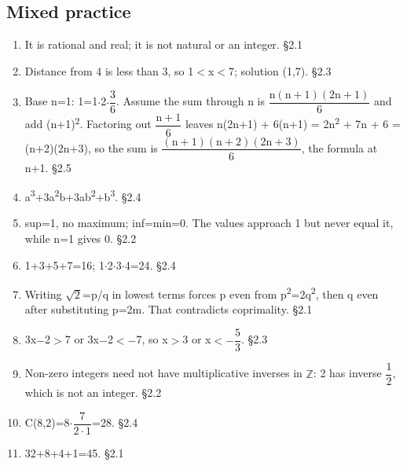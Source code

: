 \documentclass[11pt]{article}
\begin{document}
\begin{keepsection}\subsection{Mixed practice}

\begin{enumerate}
\item It is rational and real; it is not natural or an integer. \hfill{\small\color{FAUblue}§2.1}
\item Distance from 4 is less than 3, so 1\ensuremath{<}x\ensuremath{<}7; solution (1,7). \hfill{\small\color{FAUblue}§2.3}
\item Base n=1: 1=1\ensuremath{\cdot}2\ensuremath{\cdot}{\small\ensuremath{\dfrac{3}{6}}}. Assume the sum through n is {\small\ensuremath{\dfrac{\mathrm{n}(\mathrm{n}+1)(2\mathrm{n}+1)}{6}}} and add (n+1)\textsuperscript{2}. Factoring out {\small\ensuremath{\dfrac{\mathrm{n}+1}{6}}} leaves n(2n+1) + 6(n+1) = 2n\textsuperscript{2} + 7n + 6 = (n+2)(2n+3), so the sum is {\small\ensuremath{\dfrac{(\mathrm{n}+1)(\mathrm{n}+2)(2\mathrm{n}+3)}{6}}}, the formula at n+1. \hfill{\small\color{FAUblue}§2.5}
\item a\textsuperscript{3}+3a\textsuperscript{2}b+3ab\textsuperscript{2}+b\textsuperscript{3}. \hfill{\small\color{FAUblue}§2.4}
\item sup=1, no maximum; inf=min=0. The values approach 1 but never equal it, while n=1 gives 0. \hfill{\small\color{FAUblue}§2.2}
\item 1+3+5+7=16; 1\ensuremath{\cdot}2\ensuremath{\cdot}3\ensuremath{\cdot}4=24. \hfill{\small\color{FAUblue}§2.4}
\item Writing \ensuremath{\sqrt{2}}=p/q in lowest terms forces p even from p\textsuperscript{2}=2q\textsuperscript{2}, then q even after substituting p=2m. That contradicts coprimality. \hfill{\small\color{FAUblue}§2.1}
\item 3x\ensuremath{-}2\ensuremath{>}7 or 3x\ensuremath{-}2\ensuremath{<}\ensuremath{-}7, so x\ensuremath{>}3 or x\ensuremath{<}\ensuremath{-}{\small\ensuremath{\dfrac{5}{3}}}. \hfill{\small\color{FAUblue}§2.3}
\item Non-zero integers need not have multiplicative inverses in \ensuremath{\mathbb{Z}}: 2 has inverse {\small\ensuremath{\dfrac{1}{2}}}, which is not an integer. \hfill{\small\color{FAUblue}§2.2}
\item C(8,2)=8\ensuremath{\cdot}{\small\ensuremath{\dfrac{7}{2\cdot 1}}}=28. \hfill{\small\color{FAUblue}§2.4}
\item 32+8+4+1=45. \hfill{\small\color{FAUblue}§2.1}

\end{enumerate}
\end{keepsection}
\end{document}

